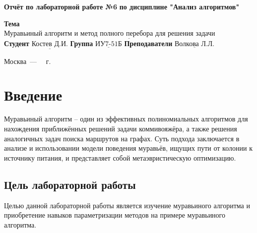 \documentclass[12pt]{report}
\begin{document}
\begin{titlepage}
		
		\begin{center}
			\noindent\begin{minipage}{1.3\textwidth}\centering
				\Large\textbf{  Отчёт по лабораторной работе №6}\newline
				\textbf{по дисциплине "Анализ алгоритмов"}\newline\newline
			\end{minipage}
		\end{center}
		
		\noindent\textbf{Тема} $\underline{\text{Муравьиный алгоритм и метод полного перебора для решения задачи коммивояжёра}}$\newline
		\noindent\textbf{Студент} $\underline{\text{Костев Д.И.}}$\newline
		\noindent\textbf{Группа} $\underline{\text{ИУ7-51Б}}$\newline
		\noindent\textbf{Преподаватели} $\underline{\text{Волкова Л.Л.}}$\newline\newline\newline\newline
		
		\begin{center}
			\vfill
			Москва~---~\the\year
			~г.
		\end{center}
	\end{titlepage}
	
	\setcounter{page}{2}
	\tableofcontents
\newpage
\chapter*{Введение}
	
Муравьиный алгоритм -- один из эффективных полиномиальных алгоритмов для нахождения приближённых решений задачи коммивояжёра, а также решения аналогичных задач поиска маршрутов на графах. Суть подхода заключается в анализе и использовании модели поведения муравьёв, ищущих пути от колонии к источнику питания, и представляет собой метаэвристическую оптимизацию.
	
\section*{Цель лабораторной работы}
	
Целью данной лабораторной работы является изучение муравьиного алгоритма и приобретение навыков параметризации методов на примере муравьиного алгоритма.
	
\end{document}
